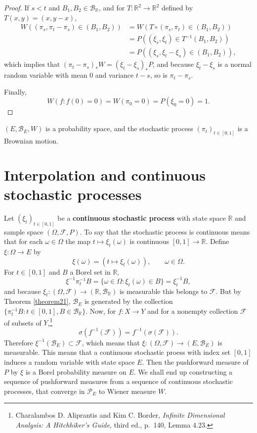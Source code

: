 \documentclass{article}
\theoremstyle{definition}
\theoremstyle{definition}
\begin{document}
\begin{proof}
If $s < t$ and $B_1,B_2 \in \mathscr{B}_{\mathbb{R}}$, and for $T:\mathbb{R}^2 \to \mathbb{R}^2$ defined by
$T(x,y)=(x,y-x)$,
\begin{align*}
W( (\pi_s, \pi_t-\pi_s) \in (B_1,B_2))&=W(T \circ (\pi_s,\pi_t) \in (B_1,B_2))\\
&=P((\xi_s,\xi_t) \in T^{-1}(B_1,B_2))\\
&=P((\xi_s,\xi_t-\xi_s) \in (B_1,B_2)),
\end{align*}
which implies that $(\pi_t-\pi_s)_*W = (\xi_t-\xi_s)_*P$, and because
$\xi_t-\xi_s$ is a normal random variable with mean $0$ and variance $t-s$, so is $\pi_t-\pi_s$. 

Finally, 
\[
W(f : f(0) = 0)=W(\pi_0 = 0)
=P(\xi_0 = 0)=1.
\]
\end{proof}

$(E,\mathscr{B}_E,W)$ is a probability space, and the stochastic process
$(\pi_t)_{t \in [0,1]}$ is a Brownian motion. 





\section{Interpolation and continuous stochastic processes}
Let $(\xi_t)_{t \in [0,1]}$ be a \textbf{continuous stochastic process} with state space $\mathbb{R}$ and sample space
$(\Omega,\mathscr{F},P)$. To say that the stochastic process is continuous means that
for each $\omega \in \Omega$ the map $t \mapsto \xi_t(\omega)$ is continuous $[0,1] \to \mathbb{R}$. 
Define $\xi:\Omega \to E$ by
\[
\xi(\omega) = (t \mapsto \xi_t(\omega)),\qquad \omega \in \Omega.
\]
For $t \in [0,1]$ and $B$ a Borel set in $\mathbb{R}$,
\[
\xi^{-1} \pi_t^{-1} B = \{\omega \in \Omega : \xi_t(\omega) \in B\} = \xi_t^{-1} B,
\]
and because $\xi_t:(\Omega,\mathscr{F}) \to (\mathbb{R},\mathscr{B}_{\mathbb{R}})$ is measurable this belongs to $\mathscr{F}$. 
But by Theorem \ref{theorem21}, $\mathscr{B}_E$ is generated by the collection $\{\pi_t^{-1} B: t \in [0,1], B \in \mathscr{B}_{\mathbb{R}}\}$. 
Now, for $f:X \to Y$ and for a nonempty collection $\mathscr{F}$ of subsets of $Y$,\footnote{Charalambos D. Aliprantis
and Kim C. Border, {\em Infinite Dimensional Analysis: A Hitchhiker's Guide}, third ed., p.~140, Lemma 4.23.}
\[
\sigma(f^{-1}(\mathscr{F})) = f^{-1}(\sigma(\mathscr{F})).
\]
Therefore $\xi^{-1}(\mathscr{B}_E) \subset \mathscr{F}$, which means that
$\xi:(\Omega,\mathscr{F}) \to (E,\mathscr{B}_E)$ is measurable. This means that a continuous stochastic proess with index set $[0,1]$ induces a random variable with state space
$E$.
Then the pushforward measure of $P$ by $\xi$ is a Borel probability measure on $E$. 
We shall end up constructing a sequence of pushforward measures from a sequence of continuous stochastic processes,
that converge in $\mathscr{P}_E$ to Wiener measure $W$. 
\end{document}
